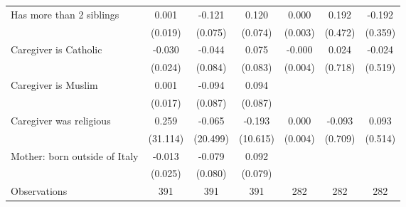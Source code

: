 {\begin{tabular}{l*{6}{c}}
\addlinespace
Has more than 2 siblings&       0.001         &      -0.121         &       0.120         &       0.000         &       0.192         &      -0.192         \\
                    &     (0.019)         &     (0.075)         &     (0.074)         &     (0.003)         &     (0.472)         &     (0.359)         \\
\addlinespace
Caregiver is Catholic&      -0.030         &      -0.044         &       0.075         &      -0.000         &       0.024         &      -0.024         \\
                    &     (0.024)         &     (0.084)         &     (0.083)         &     (0.004)         &     (0.718)         &     (0.519)         \\
\addlinespace
Caregiver is Muslim &       0.001         &      -0.094         &       0.094         &               &                &                \\
                    &     (0.017)         &     (0.087)         &     (0.087)         &               &                 &                 \\
\addlinespace
Caregiver was religious&       0.259         &      -0.065         &      -0.193         &       0.000         &      -0.093         &       0.093         \\
                    &    (31.114)         &    (20.499)         &    (10.615)         &     (0.004)         &     (0.709)         &     (0.514)         \\
\addlinespace
Mother: born outside of Italy&      -0.013         &      -0.079         &       0.092         &                &                &                \\
                    &     (0.025)         &     (0.080)         &     (0.079)         &                 &               &               \\
\midrule
Observations        &         391         &         391         &         391         &         282         &         282         &         282         \\
\bottomrule
\end{tabular}
}
